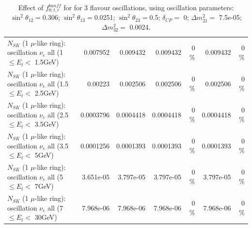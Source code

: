 \begin{table}
\begin{tabular}{| l | r | r | r  r | r  r |}
$N_{SK}$ (1 $\mu$-like ring): oscillation $\nu_{e}$ all (1 $\leq E_{t} <$ 1.5GeV) &        0.007952 &        0.009432 &        0.009432 &        0 \%  &        0.009432 &        0 \%  \\ 
$N_{SK}$ (1 $\mu$-like ring): oscillation $\nu_{e}$ all (1.5 $\leq E_{t} <$ 2.5GeV) &         0.00223 &        0.002506 &        0.002506 &        0 \%  &        0.002506 &        0 \%  \\ 
$N_{SK}$ (1 $\mu$-like ring): oscillation $\nu_{e}$ all (2.5 $\leq E_{t} <$ 3.5GeV) &       0.0003796 &       0.0004418 &       0.0004418 &        0 \%  &       0.0004418 &        0 \%  \\ 
$N_{SK}$ (1 $\mu$-like ring): oscillation $\nu_{e}$ all (3.5 $\leq E_{t} <$ 5GeV) &       0.0001256 &       0.0001393 &       0.0001393 &        0 \%  &       0.0001393 &        0 \%  \\ 
 $N_{SK}$ (1 $\mu$-like ring): oscillation $\nu_{e}$ all (5 $\leq E_{t} <$ 7GeV) &       3.651e-05 &       3.797e-05 &       3.797e-05 &        0 \%  &       3.797e-05 &        0 \%  \\ 
$N_{SK}$ (1 $\mu$-like ring): oscillation $\nu_{e}$ all (7 $\leq E_{t} <$ 30GeV) &       7.968e-06 &       7.968e-06 &       7.968e-06 &        0 \%  &       7.968e-06 &        0 \%  \\ 
\hline
\hline
\end{tabular}
\caption{ Effect of $f_{0; t, r}^{banff}$ for for 3 flavour oscillations, using oscillation parameters:  $\sin^2\theta_{12} = $0.306; $\sin^2\theta_{13} = $0.0251; $\sin^2\theta_{23} = $0.5; $\delta_{CP} = $        0; $\Delta m^2_{21} = $    7.5e-05; $\Delta m^2_{32} = $    0.0024. }
\label{tab:num_banff_00_1RmuT_3f_osc_t13:0.0251}
\end{table}
\clearpage
